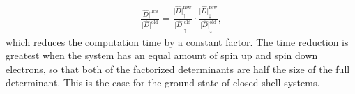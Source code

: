 \documentclass[../main.tex]{subfiles}
\begin{document}
\begin{align}
    \frac{\vert\hat{D}\vert^\mathrm{new}}{\vert\hat{D}\vert^\mathrm{old}} =
    \frac{\vert\hat{D}\vert^\mathrm{new}_\uparrow}
    {\vert\hat{D}\vert^\mathrm{old}_\uparrow}\cdot
    \frac{\vert\hat{D}\vert^\mathrm{new}_\downarrow
    }{\vert\hat{D}\vert^\mathrm{old}_\downarrow},
\end{align}
which reduces the computation time by a constant factor. The time reduction is greatest when the system has an equal amount of spin up and spin down electrons, so that both of the factorized determinants are half the size of the full determinant. This is the case for the ground state of closed-shell systems.%

\end{document}
